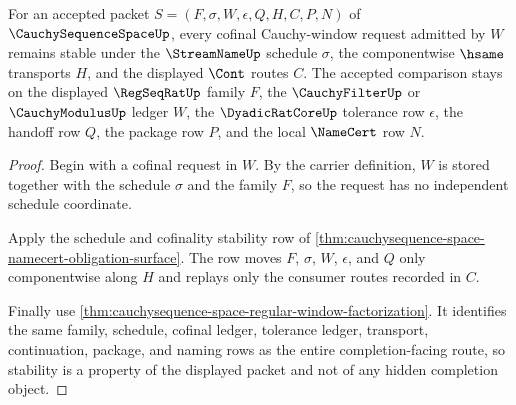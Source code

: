 \begin{theorem}
\label{thm:cauchysequence-space-cofinal-schedule-stability}
For an accepted packet $S=(F,\sigma,W,\epsilon,Q,H,C,P,N)$ of $\CauchySequenceSpaceUp$, every cofinal Cauchy-window request admitted by $W$ remains stable under the $\StreamNameUp$ schedule $\sigma$, the componentwise $\hsame$ transports $H$, and the displayed $\Cont$ routes $C$. The accepted comparison stays on the displayed $\RegSeqRatUp$ family $F$, the $\CauchyFilterUp$ or $\CauchyModulusUp$ ledger $W$, the $\DyadicRatCoreUp$ tolerance row $\epsilon$, the handoff row $Q$, the package row $P$, and the local $\NameCert$ row $N$.
\end{theorem}
\begin{proof}
Begin with a cofinal request in $W$. By the carrier definition, $W$ is stored together with the schedule $\sigma$ and the family $F$, so the request has no independent schedule coordinate.

Apply the schedule and cofinality stability row of \autoref{thm:cauchysequence-space-namecert-obligation-surface}. The row moves $F$, $\sigma$, $W$, $\epsilon$, and $Q$ only componentwise along $H$ and replays only the consumer routes recorded in $C$.

Finally use \autoref{thm:cauchysequence-space-regular-window-factorization}. It identifies the same family, schedule, cofinal ledger, tolerance ledger, transport, continuation, package, and naming rows as the entire completion-facing route, so stability is a property of the displayed packet and not of any hidden completion object.
\end{proof}

